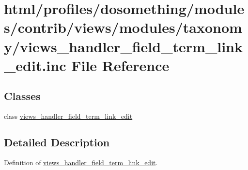 \hypertarget{views__handler__field__term__link__edit_8inc}{
\section{html/profiles/dosomething/modules/contrib/views/modules/taxonomy/views\_\-handler\_\-field\_\-term\_\-link\_\-edit.inc File Reference}
\label{views__handler__field__term__link__edit_8inc}
}
\subsection*{Classes}
\begin{DoxyCompactItemize}
\item 
class \hyperlink{classviews__handler__field__term__link__edit}{views\_\-handler\_\-field\_\-term\_\-link\_\-edit}
\end{DoxyCompactItemize}


\subsection{Detailed Description}
Definition of \hyperlink{classviews__handler__field__term__link__edit}{views\_\-handler\_\-field\_\-term\_\-link\_\-edit}. 